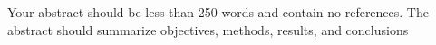 

Your abstract should be less than 250 words and contain no references. The abstract should summarize objectives, methods, results, and conclusions
